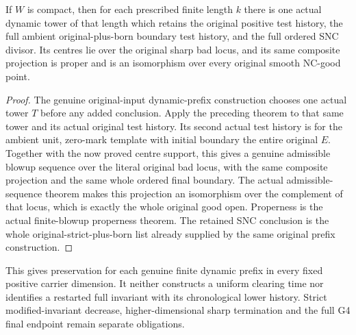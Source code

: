 \begin{theorem}
\label{hir:sharp-actual-original-dynamic-good-preserving-prefix}
\leanok
If $W$ is compact, then for each prescribed finite length $k$ there is one
actual dynamic tower of that length which retains the original positive
test history, the full ambient original-plus-born boundary test history,
and the full ordered SNC divisor. Its centres lie over the original sharp
bad locus, and its same composite projection is proper and is an isomorphism
over every original smooth NC-good point.
\end{theorem}
\begin{proof}
The genuine original-input dynamic-prefix construction chooses one actual
tower $T$ before any added conclusion. Apply the preceding theorem to that
same tower and its actual original test history. Its second actual test
history is for the ambient unit, zero-mark template with initial boundary
the entire original $E$. Together with the now proved centre support, this
gives a genuine admissible blowup sequence over the literal original bad
locus, with the same composite projection and the same whole ordered final
boundary. The actual admissible-sequence theorem makes this projection an
isomorphism over the complement of that locus, which is exactly the whole
original good open. Properness is the actual finite-blowup properness
theorem. The retained SNC conclusion is the whole original-strict-plus-born
list already supplied by the same original prefix construction.
\end{proof}

This gives preservation for each genuine finite dynamic prefix in every
fixed positive carrier dimension. It neither constructs a uniform clearing
time nor identifies a restarted full invariant with its chronological lower
history. Strict modified-invariant decrease, higher-dimensional sharp
termination and the full G4 final endpoint remain separate obligations.
